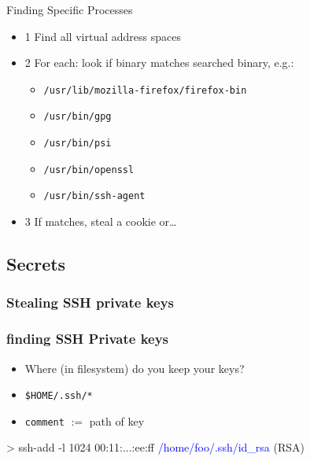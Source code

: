 \documentclass{beamer}
\newenvironment{itemizeframe}[1]
  {\begin{frame}{#1}\startitemizeframe}
  {\stopitemizeframe\end{frame}}
\newcommand\startitemizeframe{\begin{itemize}}
\newcommand\stopitemizeframe{\end{itemize}}
\begin{document}
		\begin{itemizeframe}{Finding Specific Processes}
			\item[1] Find all virtual address spaces
			\item[2] For each: look if binary matches searched binary, e.g.:
			\begin{itemize}
				\item \texttt{/usr/lib/mozilla-firefox/firefox-bin}
				\item \texttt{/usr/bin/gpg}
				\item \texttt{/usr/bin/psi}
				\item \texttt{/usr/bin/openssl}
				\item \texttt{/usr/bin/ssh-agent}
			\end{itemize}
			\item[3] If matches, steal a cookie or\ldots \uncover<2->{a ssh-private key}
		\end{itemizeframe}

	\subsection{Secrets}

		\begin{frame} \frametitle{Stealing SSH private keys}

		\end{frame}

		\begin{frame}[fragile] \frametitle{finding SSH Private keys}
			\begin{itemize}
				\item Where (in filesystem) do you keep your keys?
				\item \texttt{\$HOME/.ssh/*}
				\item \texttt{comment} $:=$ path of key
			\end{itemize}
			\begin{semiverbatim}
				> ssh-add -l
				1024 00:11:...:ee:ff \textcolor{blue}{/home/foo/.ssh/id_rsa} (RSA)
			\end{semiverbatim}
		\end{frame}
\end{document}
